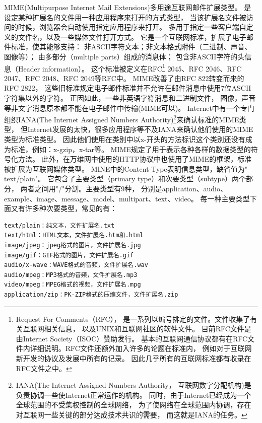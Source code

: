 \documentclass{book}
\begin{document}
MIME(Multipurpose Internet Mail Extensions)多用途互联网邮件扩展类型。
是设定某种扩展名的文件用一种应用程序来打开的方式类型，
当该扩展名文件被访问的时候，浏览器会自动使用指定应用程序来打开。
多用于指定一些客户端自定义的文件名，以及一些媒体文件打开方式。
它是一个互联网标准，扩展了电子邮件标准，使其能够支持：
非ASCII字符文本；非文本格式附件（二进制、声音、图像等）；
由多部分（multiple parts）组成的消息体；
包含非ASCII字符的头信息（Header information）。
这个标准被定义在RFC\footnote{Request For Comments（RFC），
是一系列以编号排定的文件。文件收集了有关互联网相关信息，
以及UNIX和互联网社区的软件文件。
目前RFC文件是由Internet Society（ISOC）赞助发行。
基本的互联网通信协议都有在RFC文件内详细说明。RFC文件还额外加入许多的论题在标准内，
例如对于互联网新开发的协议及发展中所有的记录。
因此几乎所有的互联网标准都有收录在RFC文件之中。} 2045、RFC 2046、RFC 2047、RFC 2048、RFC 2049等RFC中。 
MIME改善了由RFC 822转变而来的RFC 2822，
这些旧标准规定电子邮件标准并不允许在邮件消息中使用7位ASCII字符集以外的字符。
正因如此，一些非英语字符消息和二进制文件，
图像，声音等非文字消息原本都不能在电子邮件中传输(MIME可以)。
Internet中有一个专门组织IANA(The Internet Assigned Numbers Authority)\footnote{IANA(The Internet Assigned Numbers Authority，
互联网数字分配机构)是负责协调一些使Internet正常运作的机构。
同时，由于Internet已经成为一个全球范围的不受集权控制的全球网络，
为了使网络在全球范围内协调，存在对互联网一些关键的部分达成技术共识的需要，
而这就是IANA的任务。}来确认标准的MIME类型，
但Internet发展的太快，很多应用程序等不及IANA来确认他们使用的MIME类型为标准类型。
因此他们使用在类别中以x-开头的方法标识这个类别还没有成为标准，例如：x-gzip，x-tar等。
MIME规定了用于表示各种各样的数据类型的符号化方法。 
此外，在万维网中使用的HTTP协议中也使用了MIME的框架，标准被扩展为互联网媒体类型。
MINE中的Content-Type表明信息类型，缺省值为" text/plain"。
它包含了主要类型（primary type）和次要类型（subtype）两个部分，
两者之间用"/"分割。主要类型有9种，
分别是application、audio、example、image、message、model、multipart、text、video。
每一种主要类型下面又有许多种次要类型，常见的有：

\begin{lstlisting}
text/plain：纯文本，文件扩展名.txt
text/html：HTML文本，文件扩展名.htm和.html
image/jpeg：jpeg格式的图片，文件扩展名.jpg
image/gif：GIF格式的图片，文件扩展名.gif
audio/x-wave：WAVE格式的音频，文件扩展名.wav
audio/mpeg：MP3格式的音频，文件扩展名.mp3
video/mpeg：MPEG格式的视频，文件扩展名.mpg
application/zip：PK-ZIP格式的压缩文件，文件扩展名.zip
\end{lstlisting}
\end{document}
